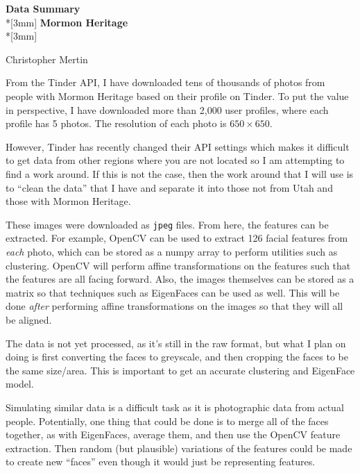\documentclass{article}
\begin{document}
\pagestyle{empty}
\begin{center}
{\Large{\bf Data Summary}}\\*[3mm]
{\bf Mormon Heritage} \\*[3mm]

Christopher Mertin
\end{center}

From the Tinder API, I have downloaded tens of thousands of photos from people with Mormon Heritage based on their profile on Tinder. To put the value in perspective, I have downloaded more than 2,000 user profiles, where each profile has 5 photos. The resolution of each photo is $650\times 650$. 

However, Tinder has recently changed their API settings which makes it difficult to get data from other regions where you are not located so I am attempting to find a work around. If this is not the case, then the work around that I will use is to ``clean the data'' that I have and separate it into those not from Utah and those with Mormon Heritage.

These images were downloaded as {\tt jpeg} files. From here, the features can be extracted. For example, OpenCV can be used to extract 126 facial features from {\em each} photo, which can be stored as a numpy array to perform utilities such as clustering. OpenCV will perform affine transformations on the features such that the features are all facing forward. Also, the images themselves can be stored as a matrix so that techniques such as EigenFaces can be used as well. This will be done {\em after} performing affine transformations on the images so that they will all be aligned. 

The data is not yet processed, as it's still in the raw format, but what I plan on doing is first converting the faces to greyscale, and then cropping the faces to be the same size/area. This is important to get an accurate clustering and EigenFace model.

Simulating similar data is a difficult task as it is photographic data from actual people. Potentially, one thing that could be done is to merge all of the faces together, as with EigenFaces, average them, and then use the OpenCV feature extraction. Then random (but plausible) variations of the features could be made to create new ``faces'' even though it would just be representing features.
\end{document}
